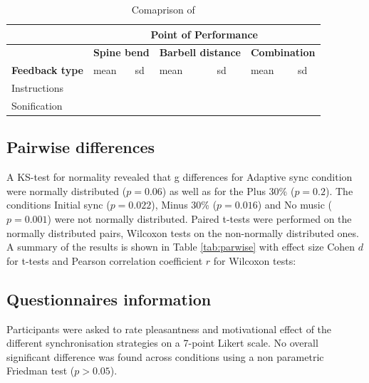 \documentclass[10pt,letterpaper]{article}
\begin{document}
\begin{table}[!h]
  \centering
  \caption{Comaprison of }
    \begin{tabular}{|l|r|r|r|r|r|r|}
    \hline
          & \multicolumn{6}{c|}{\bf Point of Performance} \\
   \hline
          & \multicolumn{2}{c|}{\bf Spine bend} & \multicolumn{2}{c|}{ \bf Barbell distance} & \multicolumn{2}{c|}{\bf Combination} \\
     \hline
   \bf Feedback type & \multicolumn{1}{l|}{mean} & \multicolumn{1}{l|}{sd} & \multicolumn{1}{l|}{mean} & \multicolumn{1}{l|}{sd} & \multicolumn{1}{l|}{mean} & \multicolumn{1}{l|}{sd} \\
    \hline
    Instructions &       &       &       &       &       &  \\
    \hline
    Sonification &       &       &       &       &       &  \\
     \hline
    \end{tabular}%
  \label{tab:addlabel}%
\end{table}%





\subsection*{Pairwise differences}



A KS-test for normality revealed that g differences for Adaptive sync condition were normally distributed ($p=0.06$) as well as for the  Plus 30\% ($p=0.2$). The conditions Initial sync ($p=0.022$), Minus 30\% ($p=0.016$) and No music ($p=0.001$) were not normally distributed. 
Paired t-tests were performed on the normally distributed pairs, Wilcoxon tests on the non-normally distributed ones. A summary of the results is shown in Table \ref{tab:parwise} with effect size Cohen $d$ for t-tests and Pearson correlation coefficient $r$ for Wilcoxon tests:




\subsection*{Questionnaires information}

Participants were asked to rate pleasantness and motivational effect of the different synchronisation strategies on a 7-point Likert scale. No overall significant difference was found across conditions using a non parametric Friedman test ($p > 0.05$). 
\end{document}
